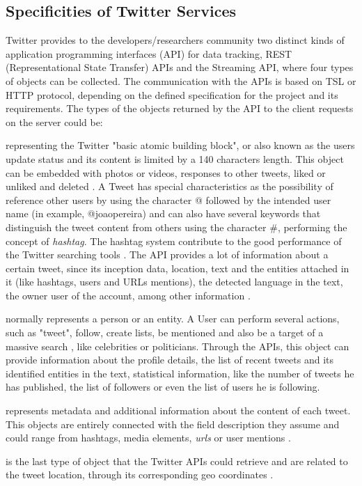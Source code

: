 \subsection{Specificities of Twitter Services}
Twitter provides to the developers/researchers community two distinct kinds of application programming interfaces (API) for data tracking, REST (Representational State Transfer) APIs and the Streaming API, where four types of objects can be collected. The communication with the APIs is based on TSL or HTTP protocol, depending on the defined specification for the project and its requirements.
The types of the objects returned by the API to the client requests on the server could be:
\begin{description}[align=left]
\item [\textbf{Tweets}] representing the Twitter "basic atomic building block", or also known as the users update status and its content is limited by a 140 characters length. This object can be embedded with photos or videos, responses to other tweets, liked or unliked and deleted \cite{kn:TwitterTweets}. A Tweet has special characteristics as the possibility of reference other users by using the character @ followed by the intended user name (in example, @joaopereira) and can also have several keywords that distinguish the tweet content from others using the character \#, performing the concept of \textit{hashtag}. The hashtag system contribute to the good performance of the Twitter searching tools \cite{kn:Sriram2010}. The API provides a lot of information about a certain tweet, since its inception data, location, text and the entities attached in it (like hashtags, users and URLs mentions), the detected language in the text, the owner user of the account, among other information \cite{kn:TwitterTweets}.

\item [\textbf{Users}] normally represents a person or an entity. A User can perform several actions, such as "tweet", follow, create lists, be mentioned and also be a target of a massive search \cite{kn:TwitterUsers}, like celebrities or politicians. Through the APIs, this object can provide information about the profile details, the list of recent tweets and its identified entities in the text, statistical information, like the number of tweets he has published, the list of followers or even the list of users he is following.

\item [\textbf{Entities}] represents metadata and additional information about the content of each tweet. This objects are entirely connected with the field description they assume and could range from hashtags, media elements, \textit{urls} or user mentions \cite{kn:TwitterEntities}.

\item [\textbf{Places}] is the last type of object that the Twitter APIs could retrieve and are related to the tweet location, through its corresponding geo coordinates \cite{kn:TwitterPlaces}.
\end{description}

